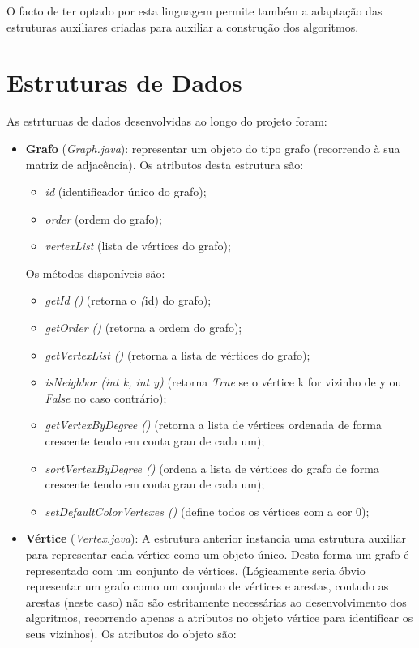 \documentclass[a4paper,10pt]{report}
\begin{document}
O facto de ter optado por esta linguagem permite também a adaptação das estruturas auxiliares criadas para auxiliar a construção dos algoritmos.

\section{Estruturas de Dados}
As estrturuas de dados desenvolvidas ao longo do projeto foram:
\begin{itemize}
    \item \textbf{Grafo} (\textit{Graph.java}): representar um objeto do tipo grafo (recorrendo à sua matriz de adjacência). Os atributos desta estrutura são:
    \begin{itemize}
        \item \textit{id} (identificador único do grafo);
        \item \textit{order} (ordem do grafo);
        \item \textit{vertexList} (lista de vértices do grafo);
    \end{itemize}
    Os métodos disponíveis são:
    \begin{itemize}
        \item \textit{getId ()} (retorna o \textit(id) do grafo);
        \item \textit{getOrder ()} (retorna a ordem do grafo);
        \item \textit{getVertexList ()} (retorna a lista de vértices do grafo);
        \item \textit{isNeighbor (int k, int y)} (retorna \textit{True} se o vértice k for vizinho de y ou \textit{False} no caso contrário);
        \item \textit{getVertexByDegree ()} (retorna a lista de vértices ordenada de forma crescente tendo em conta grau de cada um);
        \item \textit{sortVertexByDegree ()} (ordena a lista de vértices do grafo de forma crescente tendo em conta grau de cada um);
        \item \textit{setDefaultColorVertexes ()} (define todos os vértices com a cor 0);
    \end{itemize}
    \item \textbf{Vértice} (\textit{Vertex.java}):
    A estrutura anterior instancia uma estrutura auxiliar para representar cada vértice como um objeto único. Desta forma um grafo é representado com um conjunto de vértices.
    (Lógicamente seria óbvio representar um grafo como um conjunto de vértices e arestas, contudo as arestas (neste caso) não são estritamente necessárias ao desenvolvimento dos algoritmos, recorrendo apenas a atributos no objeto vértice para identificar os seus vizinhos). Os atributos do objeto são:

\end{itemize}
\end{document}

